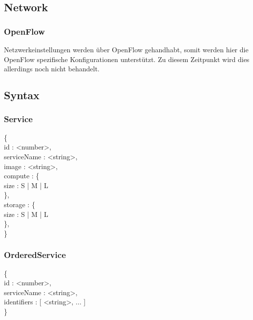 \documentclass[11pt]{scrartcl}
\begin{document}
\subsection{Network}
\subsubsection{OpenFlow}
Netzwerkeinstellungen werden über OpenFlow gehandhabt, somit werden hier die 
OpenFlow spezifische Konfigurationen unterstützt.
Zu diesem Zeitpunkt wird dies allerdings noch nicht behandelt.


\subsection{Syntax}

\subsubsection{Service}

\{\\
id : <number>,\\
serviceName : <string>,\\
image : <string>,\\

compute : \{\\
size : S | M | L\\
\},\\

storage : \{\\
size : S | M | L\\
\},\\
\}\\

\subsubsection{OrderedService}

\{\\
id : <number>,\\
serviceName : <string>,\\

identifiers : [ <string>, ... ]\\
\}\\
\end{document}

